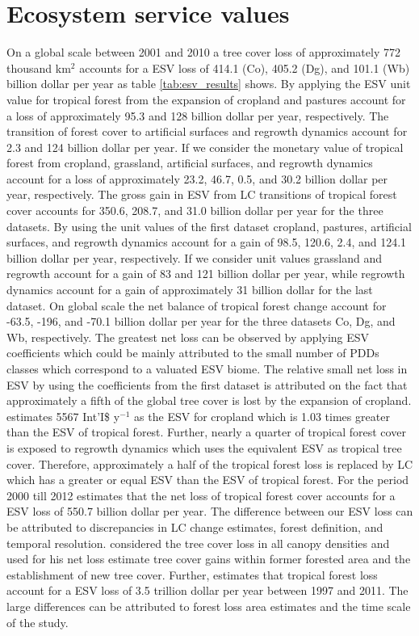 	\section{Ecosystem service values}
		On a global scale between 2001 and 2010 a tree cover loss of approximately 772 thousand km$^2$ accounts for a \ac{ESV} loss of 414.1 (Co), 405.2 (Dg), and 101.1 (Wb) billion dollar per year as table \ref{tab:esv_results} shows. By applying the \ac{ESV} unit value for tropical forest from \citet{Costanza2014} the expansion of cropland and pastures account for a loss of approximately 95.3 and 128 billion dollar per year, respectively. The transition of forest cover to artificial surfaces and regrowth dynamics account for 2.3 and 124 billion dollar per year. If we consider the monetary value of tropical forest from \citet{Siikamaki2015} cropland, grassland, artificial surfaces, and regrowth dynamics account for a loss of approximately 23.2, 46.7, 0.5, and 30.2 billion dollar per year, respectively. The gross gain in \ac{ESV} from \ac{LC} transitions of tropical forest cover accounts for 350.6, 208.7, and 31.0 billion dollar per year for the three datasets. By using the unit values of the first dataset cropland, pastures, artificial surfaces, and regrowth dynamics account for a gain of 98.5, 120.6, 2.4, and 124.1 billion dollar per year, respectively. If we consider \citet{Groot2012} unit values grassland and regrowth account for a gain of 83 and 121 billion dollar per year, while regrowth dynamics account for a gain of approximately 31 billion dollar for the last dataset. On global scale the net balance of tropical forest change account for -63.5, -196, and -70.1 billion dollar per year for the three datasets Co, Dg, and Wb, respectively. The greatest net loss can be observed by applying \citeauthor{Groot2012} \ac{ESV} coefficients which could be mainly attributed to the small number of \acp{PDD} classes which correspond to a valuated \ac{ESV} biome. The relative small net loss in \ac{ESV} by using the coefficients from the first dataset is attributed on the fact that approximately a fifth of the global tree cover is lost by the expansion of cropland. \citeauthor{Costanza2014} estimates 5567 Int'I\$ y$^{-1}$ as the \ac{ESV} for cropland which is 1.03 times greater than the \ac{ESV} of tropical forest. Further, nearly a quarter of tropical forest cover is exposed to regrowth dynamics which uses the equivalent \ac{ESV} as tropical tree cover. Therefore, approximately a half of the tropical forest loss is replaced by \ac{LC} which has a greater or equal \ac{ESV} than the \ac{ESV} of tropical forest. For the period 2000 till 2012 \citet{Song2018} estimates that the net loss of tropical forest cover accounts for a \ac{ESV} loss of 550.7 billion dollar per year. The difference between our \ac{ESV} loss can be attributed to discrepancies in \ac{LC} change estimates, forest definition, and temporal resolution. \citeauthor{Song2018} considered the tree cover loss in all canopy densities and used for his net loss estimate tree cover gains within former forested area and the establishment of new tree cover. Further, \citet{Costanza2014} estimates that tropical forest loss account for a \ac{ESV} loss of 3.5 trillion dollar per year between 1997 and 2011. The large differences can be attributed to forest loss area estimates and the time scale of the study.
